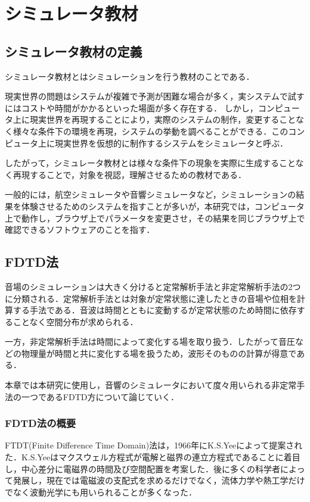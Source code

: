 \documentclass[a4j,12pt]{jsarticle}
\begin{document}
\section{シミュレータ教材}
\subsection{シミュレータ教材の定義}
シミュレータ教材とはシミュレーションを行う教材のことである．

現実世界の問題はシステムが複雑で予測が困難な場合が多く，実システムで試すにはコストや時間がかかるといった場面が多く存在する．
しかし，コンピュータ上に現実世界を再現することにより，実際のシステムの制作，変更することなく様々な条件下の環境を再現，システムの挙動を調べることができる．このコンピュータ上に現実世界を仮想的に制作するシステムをシミュレータと呼ぶ．

したがって，シミュレータ教材とは様々な条件下の現象を実際に生成することなく再現することで，対象を視認，理解させるための教材である．

一般的には，航空シミュレータや音響シミュレータなど，シミュレーションの結果を体験させるためのシステムを指すことが多いが，本研究では，コンピュータ上で動作し，ブラウザ上でパラメータを変更させ，その結果を同じブラウザ上で確認できるソフトウェアのことを指す．

\subsection{FDTD法}
音場のシミュレーションは大きく分けると定常解析手法と非定常解析手法の2つに分類される．定常解析手法とは対象が定常状態に達したときの音場や位相を計算する手法である．音波は時間とともに変動するが定常状態のため時間に依存することなく空間分布が求められる．

一方，非定常解析手法は時間によって変化する場を取り扱う．したがって音圧などの物理量が時間と共に変化する場を扱うため，波形そのものの計算が得意である．

本章では本研究に使用し，音響のシミュレータにおいて度々用いられる非定常手法の一つであるFDTD方について論じていく．

\subsubsection{FDTD法の概要}
FTDT(Finite Difference Time Domain)法は，1966年にK.S.Yeeによって提案された．K.S.Yeeはマクスウェル方程式が電解と磁界の連立方程式であることに着目し，中心差分に電磁界の時間及び空間配置を考案した．後に多くの科学者によって発展し，現在では電磁波の支配式を求めるだけでなく，流体力学や熱工学だけでなく波動光学にも用いられることが多くなった．
\newpage
\end{document}
